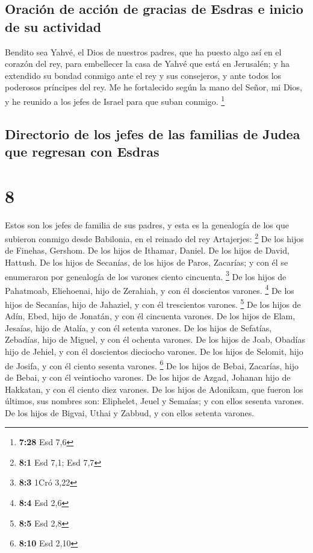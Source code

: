 \hypertarget{oraciuxf3n-de-acciuxf3n-de-gracias-de-esdras-e-inicio-de-su-actividad}{%
\subsection{Oración de acción de gracias de Esdras e inicio de su
actividad}\label{oraciuxf3n-de-acciuxf3n-de-gracias-de-esdras-e-inicio-de-su-actividad}}

 Bendito sea Yahvé, el Dios de nuestros padres, que ha
puesto algo así en el corazón del rey, para embellecer la casa de Yahvé
que está en Jerusalén;  y ha extendido su bondad conmigo
ante el rey y sus consejeros, y ante todos los poderosos príncipes del
rey. Me he fortalecido según la mano del Señor, mi Dios, y he reunido a
los jefes de Israel para que suban conmigo. \footnote{\textbf{7:28} Esd
  7,6}

\hypertarget{directorio-de-los-jefes-de-las-familias-de-judea-que-regresan-con-esdras}{%
\subsection{Directorio de los jefes de las familias de Judea que
regresan con
Esdras}\label{directorio-de-los-jefes-de-las-familias-de-judea-que-regresan-con-esdras}}

\hypertarget{section-7}{%
\section{8}\label{section-7}}

 Estos son los jefes de familia de sus padres, y esta es
la genealogía de los que subieron conmigo desde Babilonia, en el reinado
del rey Artajerjes: \footnote{\textbf{8:1} Esd 7,1; Esd 7,7}
 De los hijos de Finehas, Gershom. De los hijos de
Ithamar, Daniel. De los hijos de David, Hattush.  De los
hijos de Secanías, de los hijos de Paros, Zacarías; y con él se
enumeraron por genealogía de los varones ciento cincuenta. \footnote{\textbf{8:3}
  1Cró 3,22}  De los hijos de Pahatmoab, Eliehoenai, hijo
de Zerahiah, y con él doscientos varones. \footnote{\textbf{8:4} Esd 2,6}
 De los hijos de Secanías, hijo de Jahaziel, y con él
trescientos varones. \footnote{\textbf{8:5} Esd 2,8}  De
los hijos de Adín, Ebed, hijo de Jonatán, y con él cincuenta varones.
 De los hijos de Elam, Jesaías, hijo de Atalía, y con él
setenta varones.  De los hijos de Sefatías, Zebadías, hijo
de Miguel, y con él ochenta varones.  De los hijos de
Joab, Obadías hijo de Jehiel, y con él doscientos dieciocho varones.
 De los hijos de Selomit, hijo de Josifa, y con él ciento
sesenta varones. \footnote{\textbf{8:10} Esd 2,10}  De
los hijos de Bebai, Zacarías, hijo de Bebai, y con él veintiocho
varones.  De los hijos de Azgad, Johanan hijo de
Hakkatan, y con él ciento diez varones.  De los hijos de
Adonikam, que fueron los últimos, sus nombres son: Eliphelet, Jeuel y
Semaías; y con ellos sesenta varones.  De los hijos de
Bigvai, Uthai y Zabbud, y con ellos setenta varones.

